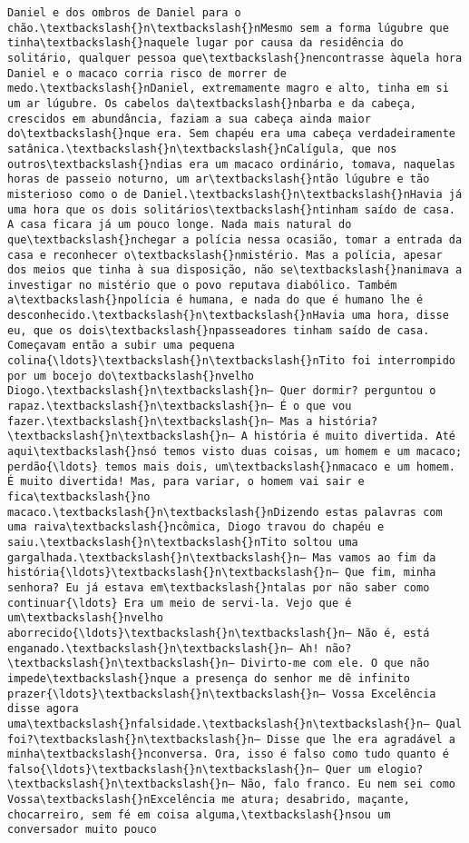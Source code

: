 \begin{Verbatim}[commandchars=\\\{\}]
Daniel e dos ombros de Daniel para o chão.\textbackslash{}n\textbackslash{}nMesmo sem a forma lúgubre que tinha\textbackslash{}naquele lugar por causa da residência do solitário, qualquer pessoa que\textbackslash{}nencontrasse àquela hora Daniel e o macaco corria risco de morrer de medo.\textbackslash{}nDaniel, extremamente magro e alto, tinha em si um ar lúgubre. Os cabelos da\textbackslash{}nbarba e da cabeça, crescidos em abundância, faziam a sua cabeça ainda maior do\textbackslash{}nque era. Sem chapéu era uma cabeça verdadeiramente satânica.\textbackslash{}n\textbackslash{}nCalígula, que nos outros\textbackslash{}ndias era um macaco ordinário, tomava, naquelas horas de passeio noturno, um ar\textbackslash{}ntão lúgubre e tão misterioso como o de Daniel.\textbackslash{}n\textbackslash{}nHavia já uma hora que os dois solitários\textbackslash{}ntinham saído de casa. A casa ficara já um pouco longe. Nada mais natural do que\textbackslash{}nchegar a polícia nessa ocasião, tomar a entrada da casa e reconhecer o\textbackslash{}nmistério. Mas a polícia, apesar dos meios que tinha à sua disposição, não se\textbackslash{}nanimava a investigar no mistério que o povo reputava diabólico. Também a\textbackslash{}npolícia é humana, e nada do que é humano lhe é desconhecido.\textbackslash{}n\textbackslash{}nHavia uma hora, disse eu, que os dois\textbackslash{}npasseadores tinham saído de casa. Começavam então a subir uma pequena colina{\ldots}\textbackslash{}n\textbackslash{}nTito foi interrompido por um bocejo do\textbackslash{}nvelho Diogo.\textbackslash{}n\textbackslash{}n— Quer dormir? perguntou o rapaz.\textbackslash{}n\textbackslash{}n— É o que vou fazer.\textbackslash{}n\textbackslash{}n— Mas a história?\textbackslash{}n\textbackslash{}n— A história é muito divertida. Até aqui\textbackslash{}nsó temos visto duas coisas, um homem e um macaco; perdão{\ldots} temos mais dois, um\textbackslash{}nmacaco e um homem. É muito divertida! Mas, para variar, o homem vai sair e fica\textbackslash{}no macaco.\textbackslash{}n\textbackslash{}nDizendo estas palavras com uma raiva\textbackslash{}ncômica, Diogo travou do chapéu e saiu.\textbackslash{}n\textbackslash{}nTito soltou uma gargalhada.\textbackslash{}n\textbackslash{}n— Mas vamos ao fim da história{\ldots}\textbackslash{}n\textbackslash{}n— Que fim, minha senhora? Eu já estava em\textbackslash{}ntalas por não saber como continuar{\ldots} Era um meio de servi-la. Vejo que é um\textbackslash{}nvelho aborrecido{\ldots}\textbackslash{}n\textbackslash{}n— Não é, está enganado.\textbackslash{}n\textbackslash{}n— Ah! não?\textbackslash{}n\textbackslash{}n— Divirto-me com ele. O que não impede\textbackslash{}nque a presença do senhor me dê infinito prazer{\ldots}\textbackslash{}n\textbackslash{}n— Vossa Excelência disse agora uma\textbackslash{}nfalsidade.\textbackslash{}n\textbackslash{}n— Qual foi?\textbackslash{}n\textbackslash{}n— Disse que lhe era agradável a minha\textbackslash{}nconversa. Ora, isso é falso como tudo quanto é falso{\ldots}\textbackslash{}n\textbackslash{}n— Quer um elogio?\textbackslash{}n\textbackslash{}n— Não, falo franco. Eu nem sei como Vossa\textbackslash{}nExcelência me atura; desabrido, maçante, chocarreiro, sem fé em coisa alguma,\textbackslash{}nsou um conversador muito pouco 
\end{Verbatim}
